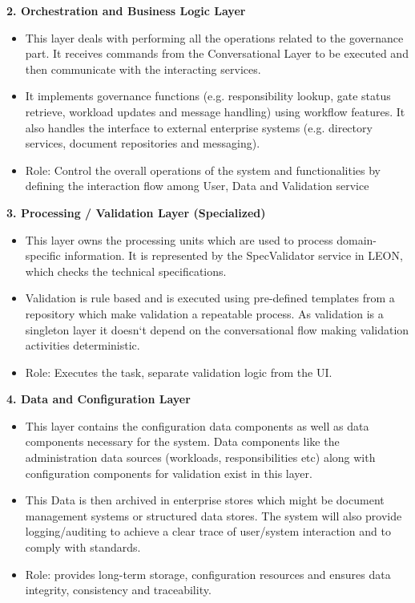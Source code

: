 \noindent\textcolor[HTML]{0066CC}{\textbf{2. Orchestration and Business Logic Layer}}
\begin{itemize}
    \item This layer deals with performing all the operations related to the governance part. It receives commands from the Conversational Layer to be executed and then communicate with the interacting services.
    \item It implements governance functions (e.g. responsibility lookup, gate status retrieve, workload updates and message handling) using workflow features. It also handles the interface to external enterprise systems (e.g. directory services, document repositories and messaging).
    \item Role: Control the overall operations of the system and functionalities by defining the interaction flow among User, Data and Validation service
\end{itemize}

\noindent\textcolor[HTML]{0066CC}{\textbf{3. Processing / Validation Layer (Specialized)}}
\begin{itemize}
    \item This layer owns the processing units which are used to process domain-specific information. It is represented by the SpecValidator service in LEON, which checks the technical specifications.
    \item Validation is rule based and is executed using pre-defined templates from a repository which make validation a repeatable process. As validation is a singleton layer it doesn‘t depend on the conversational flow making validation activities deterministic.
    \item Role: Executes the task, separate validation logic from the UI.
\end{itemize}

\noindent\textcolor[HTML]{0066CC}{\textbf{4. Data and Configuration Layer}}
\begin{itemize}
    \item This layer contains the configuration data components as well as data components necessary for the system. Data components like the administration data sources (workloads, responsibilities etc) along with configuration components for validation exist in this layer.
    \item This Data is then archived in enterprise stores which might be document management systems or structured data stores. The system will also provide logging/auditing to achieve a clear trace of user/system interaction and to comply with standards.
    \item Role: provides long-term storage, configuration resources and ensures data integrity, consistency and traceability.
\end{itemize}

